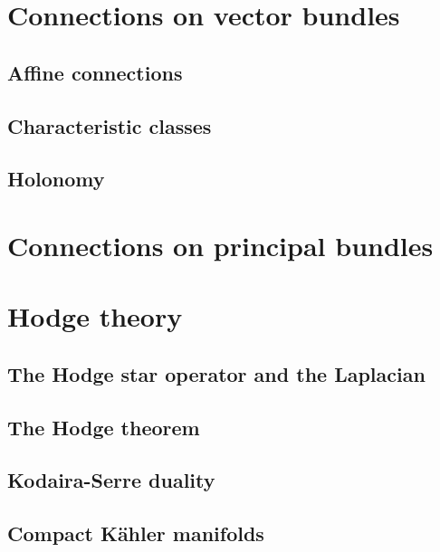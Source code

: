 \documentclass[11pt,a4paper]{book}
\theoremstyle{remark} \newtheorem{rmk}[thm]{Remark}
\theoremstyle{definition} \newtheorem{defn}[thm]{Definition}
\theoremstyle{definition} \newtheorem{ex}[thm]{Example}
\theoremstyle{definition} \newtheorem{ej}[thm]{Exercise}
\begin{document}
\chapter{Connections on vector bundles}
\section{Affine connections}
\section{Characteristic classes}
\section{Holonomy}

\chapter{Connections on principal bundles}

\chapter{Hodge theory}
\section{The Hodge star operator and the Laplacian}
\section{The Hodge theorem}
\section{Kodaira-Serre duality}
\section{Compact Kähler manifolds}

%

\end{document}
